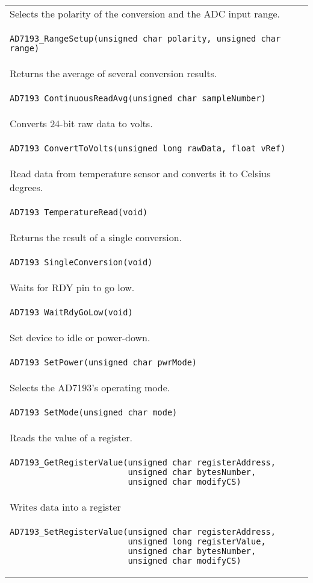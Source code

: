 \documentclass[10pt,a4paper]{report}
\begin{document}
\begin{tabular}{|l|}
Selects the polarity of the conversion and the ADC input range.\\
\begin{lstlisting}
AD7193_RangeSetup(unsigned char polarity, unsigned char range)
\end{lstlisting} \\
\hline
Returns the average of several conversion results.\\
\begin{lstlisting}
AD7193_ContinuousReadAvg(unsigned char sampleNumber)
\end{lstlisting}\\
\hline
 Converts 24-bit raw data to volts.\\
\begin{lstlisting}
AD7193_ConvertToVolts(unsigned long rawData, float vRef)
\end{lstlisting}\\
\hline
Read data from temperature sensor and converts it to Celsius degrees.\\
\begin{lstlisting}
AD7193_TemperatureRead(void)
\end{lstlisting} \\
\hline
Returns the result of a single conversion.\\
\begin{lstlisting}
AD7193_SingleConversion(void)
\end{lstlisting} \\
\hline
Waits for RDY pin to go low.\\
\begin{lstlisting}
AD7193_WaitRdyGoLow(void)
\end{lstlisting} \\
\hline
 Set device to idle or power-down.\\
\begin{lstlisting}
AD7193_SetPower(unsigned char pwrMode)
\end{lstlisting}\\
\hline
Selects the AD7193's operating mode.\\
\begin{lstlisting}
AD7193_SetMode(unsigned char mode)
\end{lstlisting} \\
\hline
Reads the value of a register.\\
\begin{lstlisting}
AD7193_GetRegisterValue(unsigned char registerAddress,
                        unsigned char bytesNumber,
                        unsigned char modifyCS)
\end{lstlisting}\\
\hline                                       

Writes data into a register\\
\begin{lstlisting}
AD7193_SetRegisterValue(unsigned char registerAddress,
                        unsigned long registerValue,
                        unsigned char bytesNumber,
                        unsigned char modifyCS)
\end{lstlisting}\\
\hline
\end{tabular}
\end{document}
